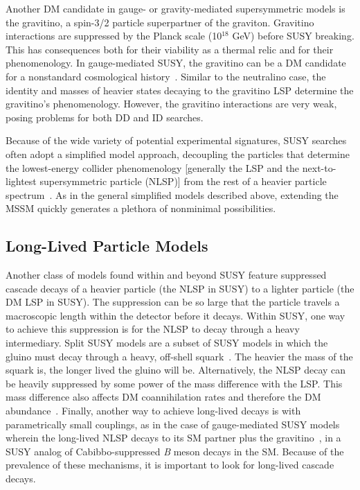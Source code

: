 \documentclass{ar-1col}
\begin{document}
Another DM candidate in gauge- or gravity-mediated supersymmetric
models is the gravitino, a spin-3/2 particle superpartner of the
graviton. Gravitino interactions are suppressed by the Planck
scale (10$^{18}$ GeV) before SUSY breaking. This has consequences
both for their viability as a thermal relic and for their
phenomenology. In gauge-mediated SUSY, the gravitino can be a DM
candidate for a nonstandard cosmological
history~\cite{Dimopoulos:1996vz}. Similar to the neutralino case,
the identity and masses of heavier states decaying to the
gravitino LSP determine the gravitino's phenomenology. However, the gravitino
interactions are very weak, posing problems for both DD and
ID searches.

Because of the wide variety of potential experimental signatures,
SUSY searches often adopt a simplified model approach,
decoupling the particles that determine the lowest-energy collider
phenomenology [generally the LSP and the next-to-lightest supersymmetric particle (NLSP)] from the rest of a heavier
particle spectrum~\cite{Alves:2011wf}. As in the general
simplified models described above, extending the MSSM quickly
generates a plethora of nonminimal possibilities.

\subsection{Long-Lived Particle Models}\label{sec:LLPModels}

Another class of models found within and beyond SUSY feature suppressed cascade decays of a heavier particle (the NLSP
in SUSY) to a lighter particle (the DM LSP in SUSY). The
suppression can be so large that the particle travels a
macroscopic length within the detector before it decays. Within
SUSY, one way to achieve this suppression is for the NLSP to decay
through a heavy intermediary. Split SUSY models are a
subset of SUSY models in which the gluino must decay through a heavy,
off-shell squark~\cite{Masiero:2004ft}. The heavier the mass of
the squark is, the longer lived the gluino will be. Alternatively, the NLSP
decay can be heavily suppressed by some power of the mass
difference with the LSP. This mass difference also affects DM
coannihilation rates and therefore the DM
abundance~\cite{Ellis:1999mm}. Finally, another way to achieve
long-lived decays is with parametrically small couplings, as in
the case of gauge-mediated SUSY models wherein the
long-lived NLSP decays to its SM partner plus the
gravitino~\cite{Dimopoulos:1996vz}, in a SUSY analog of Cabibbo-suppressed \textit{B} meson decays in the SM. Because of the prevalence of
these mechanisms, it is important to look for long-lived cascade
decays.
\end{document}
